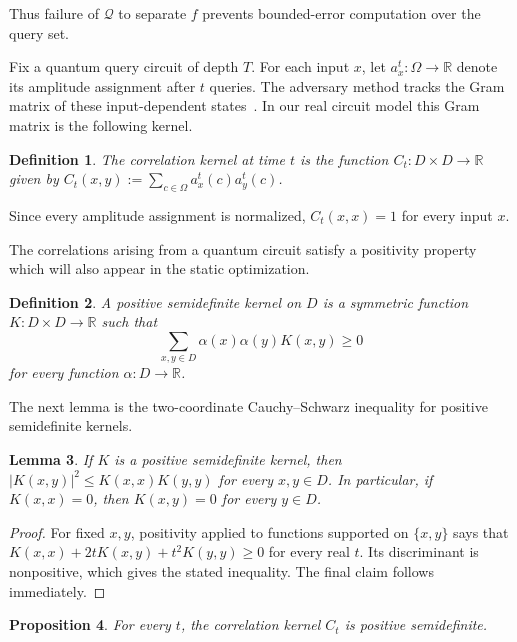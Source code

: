\documentclass[11pt]{article}
\numberwithin{equation}{section}
\newtheorem{definition}{Definition}[section]
\newtheorem{proposition}[definition]{Proposition}
\newtheorem{lemma}[definition]{Lemma}
\theoremstyle{remark}
\begin{document}
Thus failure of $\mathcal Q$ to separate $f$ prevents bounded-error computation over the query set.

Fix a quantum query circuit of depth $T$. For each input $x$, let $a_x^t:\Omega\to\mathbb R$ denote its amplitude assignment after $t$ queries. The adversary method tracks the Gram matrix of these input-dependent states~\cite{BarnumSaksSzegedy2003,HoyerLeeSpalek2007}. In our real circuit model this Gram matrix is the following kernel.

\begin{definition}
\label{def:correlation-kernel}
The \emph{correlation kernel} at time $t$ is the function
$C_t:D\times D\to\mathbb R$ given by
$C_t(x,y):=\sum_{c\in\Omega}a_x^t(c)a_y^t(c)$.
\end{definition}

Since every amplitude assignment is normalized, $C_t(x,x)=1$ for every
input $x$.

The correlations arising from a quantum circuit satisfy a positivity
property which will also appear in the static optimization.

\begin{definition}
\label{def:positive-kernel}
A \emph{positive semidefinite kernel} on $D$ is a symmetric function
$K:D\times D\to\mathbb R$ such that
\begin{equation}
    \sum_{x,y\in D}
        \alpha(x)\alpha(y)K(x,y)
    \geq0
\end{equation}
for every function $\alpha:D\to\mathbb R$.
\end{definition}

The next lemma is the two-coordinate Cauchy--Schwarz inequality for positive
semidefinite kernels.

\begin{lemma}
\label{lem:positive-kernel-entry-bound}
If $K$ is a positive semidefinite kernel, then
$|K(x,y)|^2\leq K(x,x)K(y,y)$ for every $x,y\in D$. In particular, if $K(x,x)=0$, then $K(x,y)=0$ for every $y\in D$.
\end{lemma}

\begin{proof}
For fixed $x,y$, positivity applied to functions supported on $\{x,y\}$ says that
$K(x,x)+2tK(x,y)+t^2K(y,y)\geq0$ for every real $t$. Its discriminant is nonpositive, which gives the stated inequality. The final claim follows immediately.
\end{proof}

\begin{proposition}
\label{prop:correlation-positive}
For every $t$, the correlation kernel $C_t$ is positive semidefinite.
\end{proposition}
\end{document}

